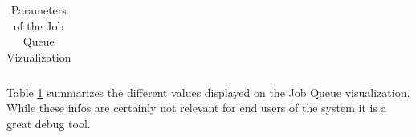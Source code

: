 \begin{table}
\begin{tabular}{|p{}|p{}|}
\hline 
\end{tabular} 
\caption{Parameters of the Job Queue Vizualization} 
\label{c1:queuecommands} 
\end{table}

Table \ref{c1:queuecommands} summarizes the different values displayed on the Job Queue visualization. 
While these infos are certainly not relevant for end users of the system it is a great debug tool.  

